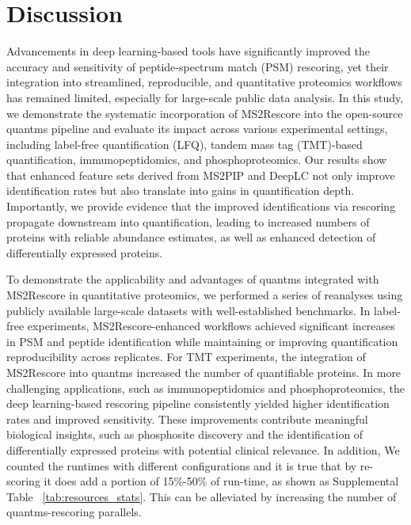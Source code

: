 \documentclass[12pt]{article}
\begin{document}
\section{Discussion}
Advancements in deep learning-based tools have significantly improved the accuracy and sensitivity of peptide-spectrum match (PSM) rescoring, yet their integration into streamlined, reproducible, and quantitative proteomics workflows has remained limited, especially for large-scale public data analysis. In this study, we demonstrate the systematic incorporation of MS2Rescore into the open-source quantms pipeline and evaluate its impact across various experimental settings, including label-free quantification (LFQ), tandem mass tag (TMT)-based quantification, immunopeptidomics, and phosphoproteomics. Our results show that enhanced feature sets derived from MS2PIP and DeepLC not only improve identification rates but also translate into gains in quantification depth. Importantly, we provide evidence that the improved identifications via rescoring propagate downstream into quantification, leading to increased numbers of proteins with reliable abundance estimates, as well as enhanced detection of differentially expressed proteins.

To demonstrate the applicability and advantages of quantms integrated with MS2Rescore in quantitative proteomics, we performed a series of reanalyses using publicly available large-scale datasets with well-established benchmarks. In label-free experiments, MS2Rescore-enhanced workflows achieved significant increases in PSM and peptide identification while maintaining or improving quantification reproducibility across replicates. For TMT experiments, the integration of MS2Rescore into quantms increased the number of quantifiable proteins. In more challenging applications, such as immunopeptidomics and phosphoproteomics, the deep learning-based rescoring pipeline consistently yielded higher identification rates and improved sensitivity. These improvements contribute meaningful biological insights, such as phosphosite discovery and the identification of differentially expressed proteins with potential clinical relevance. In addition, We counted the runtimes with different configurations and it is true that by re-scoring it does add a portion of 15\%-50\% of run-time, as shown as Supplemental Table ~\ref{tab:resources_stats}. This can be alleviated by increasing the number of quantms-rescoring parallels.
\end{document}
